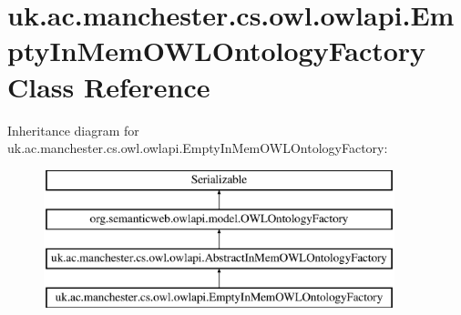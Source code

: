 \hypertarget{classuk_1_1ac_1_1manchester_1_1cs_1_1owl_1_1owlapi_1_1_empty_in_mem_o_w_l_ontology_factory}{\section{uk.\-ac.\-manchester.\-cs.\-owl.\-owlapi.\-Empty\-In\-Mem\-O\-W\-L\-Ontology\-Factory Class Reference}
\label{classuk_1_1ac_1_1manchester_1_1cs_1_1owl_1_1owlapi_1_1_empty_in_mem_o_w_l_ontology_factory}
}
Inheritance diagram for uk.\-ac.\-manchester.\-cs.\-owl.\-owlapi.\-Empty\-In\-Mem\-O\-W\-L\-Ontology\-Factory\-:\begin{figure}[H]
\begin{center}
\leavevmode
\includegraphics[height=4.000000cm]{classuk_1_1ac_1_1manchester_1_1cs_1_1owl_1_1owlapi_1_1_empty_in_mem_o_w_l_ontology_factory}
\end{center}
\end{figure}
